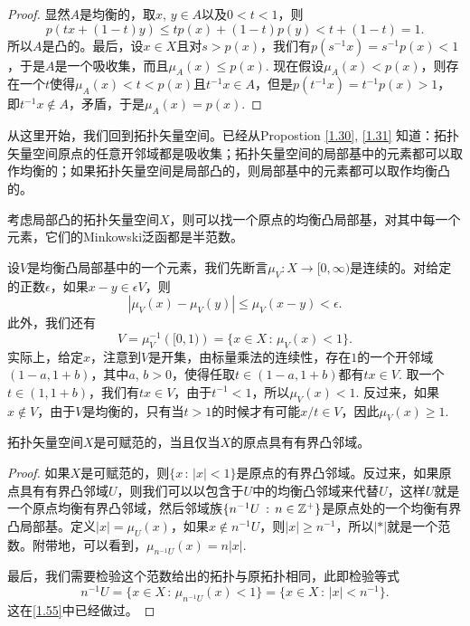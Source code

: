 \begin{proof}
显然$A$是均衡的，取$x$, $y\in A$以及$0<t<1$，则
\[
	p(tx+(1-t)y)\leq tp(x)+(1-t)p(y)< t+(1-t)=1.
\]
所以$A$是凸的。最后，设$x\in X$且对$s>p(x)$，我们有$p(s^{-1}x)=s^{-1}p(x)<1$，于是$A$是一个吸收集，而且$\mu_A(x)\leq p(x)$. 现在假设$\mu_A(x)<p(x)$，则存在一个$t$使得$\mu_A(x)<t<p(x)$且$t^{-1}x\in A$，但是$p(t^{-1}x)=t^{-1}p(x)>1$，即$t^{-1}x\not\in A$，矛盾，于是$\mu_A(x)=p(x)$.
\end{proof}

\begin{para}\label{1.55}
从这里开始，我们回到拓扑矢量空间。已经从Propostion \ref{1.30}, \ref{1.31} 知道：拓扑矢量空间原点的任意开邻域都是吸收集；拓扑矢量空间的局部基中的元素都可以取作均衡的；如果拓扑矢量空间是局部凸的，则局部基中的元素都可以取作均衡凸的。

考虑局部凸的拓扑矢量空间$X$，则可以找一个原点的均衡凸局部基，对其中每一个元素，它们的Minkowski泛函都是半范数。

设$V$是均衡凸局部基中的一个元素，我们先断言$\mu_V:X\to [0,\infty)$是连续的。对给定的正数$\epsilon$，如果$x-y\in \epsilon V$，则
\[
	|\mu_V(x)-\mu_V(y)|\leq \mu_V(x-y)<\epsilon.
\]
此外，我们还有
\[
	V=\mu_V^{-1}\left([0,1)\right)=\{x\in X\,:\, \mu_V(x)<1\}.
\]
实际上，给定$x$，注意到$V$是开集，由标量乘法的连续性，存在$1$的一个开邻域$(1-a,1+b)$，其中$a$, $b>0$，使得任取$t\in (1-a,1+b)$都有$tx\in V$. 取一个$t\in (1,1+b)$，我们有$tx\in V$，由于$t^{-1}<1$，所以$\mu_V(x)<1$. 反过来，如果$x\not\in V$，由于$V$是均衡的，只有当$t>1$的时候才有可能$x/t \in V$，因此$\mu_V(x)\geq 1$.
\end{para}

\begin{thm}\label{1.56}
拓扑矢量空间$X$是可赋范的，当且仅当$X$的原点具有有界凸邻域。
\end{thm}

\begin{proof}
如果$X$是可赋范的，则$\{x\,:\, |x|<1\}$是原点的有界凸邻域。反过来，如果原点具有有界凸邻域$U$，则我们可以以包含于$U$中的均衡凸邻域来代替$U$，这样$U$就是一个原点均衡有界凸邻域，然后邻域族$\{n^{-1}U\,:\, n\in \mathbb{Z}^+\}$是原点处的一个均衡有界凸局部基。定义$|x|=\mu_U(x)$，如果$x\not\in n^{-1}U$，则$|x|\geq n^{-1}$，所以$|*|$就是一个范数。附带地，可以看到，$\mu_{n^{-1}U}(x)=n|x|$.

最后，我们需要检验这个范数给出的拓扑与原拓扑相同，此即检验等式
\[
	n^{-1}U=\{x\in X\,:\, \mu_{n^{-1}U}(x)<1\}=\{x\in X\,:\,|x|<n^{-1}\}.
\]
这在\ref{1.55}中已经做过。
\end{proof}

